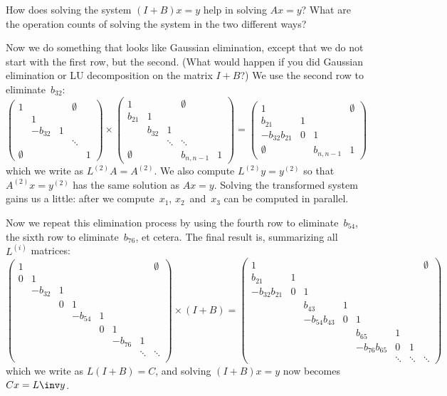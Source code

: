 \begin{exercise}
  How does solving the system $(I+B)x=y$ help in solving $Ax=y$? What
  are the operation counts of solving the system in the two different ways?
\end{exercise}

Now we do something that looks like Gaussian elimination, except that
we do not start with the first row, but the second. (What would happen
if you did Gaussian elimination or LU decomposition on the matrix
$I+B$?) We use the second row to eliminate~$b_{32}$:
\[
  \begin{pmatrix}
    1&&&\emptyset\\ &1\\ &-b_{32}&1\\ &&&\ddots\\
    \emptyset&&&&1
  \end{pmatrix}\times
  \begin{pmatrix}
    1&&&\emptyset\\ b_{21}&1\\ &b_{32}&1\\ &&\ddots&\ddots\\ 
    \emptyset&&&b_{n,n-1}&1
  \end{pmatrix}
  =
  \begin{pmatrix}
    1&&&\emptyset\\ b_{21}&1\\ -b_{32}b_{21}&0&1\\ 
    \emptyset&&b_{n,n-1}&1
  \end{pmatrix}
\]
which we write as $L^{(2)}A=A^{(2)}$. We also compute
$L^{(2)}y=y^{(2)}$ so that $A^{(2)}x=y^{(2)}$ has the same solution as
$Ax=y$. Solving the transformed system gains us a little: after we
compute~$x_1$, $x_2$~and~$x_3$ can be computed in parallel.

Now we repeat this elimination process by using the fourth row to
eliminate~$b_{54}$, the sixth row to eliminate~$b_{76}$, et
cetera. The final result is, summarizing all~$L^{(i)}$ matrices:
{\small
\[
  \begin{pmatrix}
    1&&&&&&&\emptyset\\ 0&1\\ &-b_{32}&1\\ &&0&1\\
    &&&-b_{54}&1\\ &&&&0&1\\ &&&&&-b_{76}&1\\ &&&&&&\ddots&\ddots\\
  \end{pmatrix}\times (I+B) =
  \begin{pmatrix}
    1&&&&&&&\emptyset\\ b_{21}&1\\ -b_{32}b_{21}&0&1\\ 
    &&b_{43}&1\\ &&-b_{54}b_{43}&0&1\\
    &&&&b_{65}&1\\ &&&&-b_{76}b_{65}&0&1\\ &&&&&\ddots&\ddots&\ddots
  \end{pmatrix}
\]
}
which we write as $L(I+B)=C$, and solving $(I+B)x=y$ now becomes
$Cx=L\inv y$.

